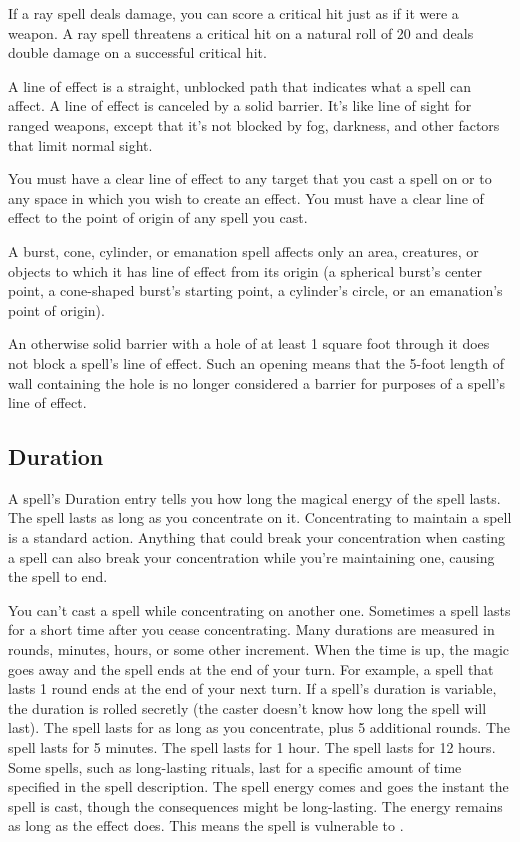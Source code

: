 If a ray spell deals damage, you can score a critical hit just as if it were a weapon. A ray spell threatens a critical hit on a natural roll of 20 and deals double damage on a successful critical hit.

 A line of effect is a straight, unblocked path that indicates what a spell can affect. A line of effect is canceled by a solid barrier. It's like line of sight for ranged weapons, except that it's not blocked by fog, darkness, and other factors that limit normal sight.

You must have a clear line of effect to any target that you cast a spell on or to any space in which you wish to create an effect. You must have a clear line of effect to the point of origin of any spell you cast.

A burst, cone, cylinder, or emanation spell affects only an area, creatures, or objects to which it has line of effect from its origin (a spherical burst's center point, a cone-shaped burst's starting point, a cylinder's circle, or an emanation's point of origin).

An otherwise solid barrier with a hole of at least 1 square foot through it does not block a spell's line of effect. Such an opening means that the 5-foot length of wall containing the hole is no longer considered a barrier for purposes of a spell's line of effect.

\subsection{Duration}
A spell's Duration entry tells you how long the magical energy of the spell lasts.
 The spell lasts as long as you concentrate on it. Concentrating to maintain a spell is a standard action. Anything that could break your concentration when casting a spell can also break your concentration while you're maintaining one, causing the spell to end.

You can't cast a spell while concentrating on another one. Sometimes a spell lasts for a short time after you cease concentrating.
 Many durations are measured in rounds, minutes, hours, or some other increment. When the time is up, the magic goes away and the spell ends at the end of your turn. For example, a spell that lasts 1 round ends at the end of your next turn. If a spell's duration is variable, the duration is rolled secretly (the caster doesn't know how long the spell will last).
 The spell lasts for as long as you concentrate, plus 5 additional rounds.
 The spell lasts for 5 minutes.
 The spell lasts for 1 hour.
 The spell lasts for 12 hours.
 Some spells, such as long-lasting rituals, last for a specific amount of time specified in the spell description.
 The spell energy comes and goes the instant the spell is cast, though the consequences might be long-lasting.
 The energy remains as long as the effect does. This means the spell is vulnerable to .


